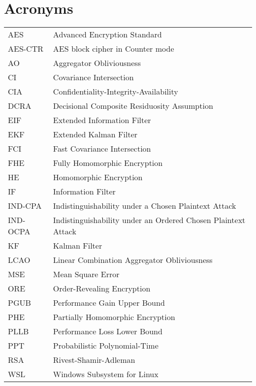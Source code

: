\documentclass[oneside]{scrbook}
\theoremstyle{definition}
\theoremstyle{definition}
\theoremstyle{remark}
\begin{document}
\section*{Acronyms}
\begin{longtable}{p{}p{}}
    AES & Advanced Encryption Standard\\
    AES-CTR & AES block cipher in Counter mode\\
    AO & Aggregator Obliviousness\\
    CI & Covariance Intersection\\
    CIA & Confidentiality-Integrity-Availability\\
    DCRA & Decisional Composite Residuosity Assumption\\
    EIF & Extended Information Filter\\
    EKF & Extended Kalman Filter\\
    FCI & Fast Covariance Intersection\\
    FHE & Fully Homomorphic Encryption\\
    HE & Homomorphic Encryption\\
    IF & Information Filter\\
    IND-CPA & Indistinguishability under a Chosen Plaintext Attack\\
    IND-OCPA & Indistinguishability under an Ordered Chosen Plaintext Attack\\
    KF & Kalman Filter\\
    LCAO & Linear Combination Aggregator Obliviousness\\
    MSE & Mean Square Error\\
    ORE & Order-Revealing Encryption\\
    PGUB & Performance Gain Upper Bound\\
    PHE & Partially Homomorphic Encryption\\
    PLLB & Performance Loss Lower Bound\\
    PPT & Probabilistic Polynomial-Time\\
    RSA & Rivest-Shamir-Adleman\\
    WSL & Windows Subsystem for Linux
\end{longtable}

% 
%                                              
%                                              
%                                              
% 
\end{document}
